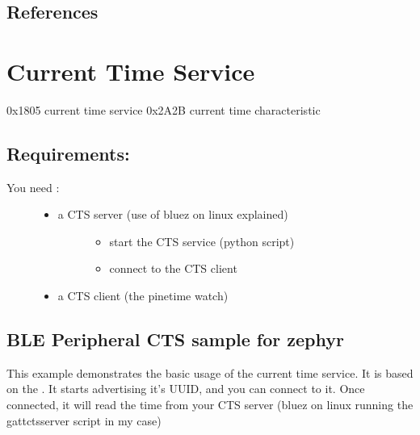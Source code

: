 \documentclass[letterpaper,10pt,english]{sphinxmanual}
\begin{document}
\section{References}
\label{\detokenize{sensor:references}}

\chapter{Current Time Service}
\label{\detokenize{current-time:current-time-service}}\label{\detokenize{current-time::doc}}
0x1805 current time service
0x2A2B current time characteristic


\section{Requirements:}
\label{\detokenize{current-time:requirements}}\begin{description}
\item[{You need :}] \leavevmode\begin{itemize}
\item {} \begin{description}
\item[{a CTS server (use of bluez on linux explained)}] \leavevmode\begin{itemize}
\item {} 
start the CTS service (python script)

\item {} 
connect to the CTS client

\end{itemize}

\end{description}

\item {} 
a CTS client (the pinetime watch)

\end{itemize}

\end{description}


\section{BLE Peripheral CTS sample for zephyr}
\label{\detokenize{current-time:ble-peripheral-cts-sample-for-zephyr}}
This example demonstrates the basic usage of the current time service.
It is based on the .
It starts advertising it’s UUID, and you can connect to it.
Once connected, it will read the time from your CTS server (bluez on linux running the gatt\sphinxhyphen{}cts\sphinxhyphen{}server script in my case)
\end{document}
